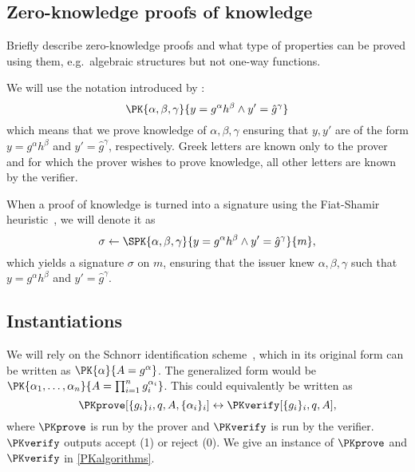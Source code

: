 \subsection{Zero-knowledge proofs of knowledge}%
\label{ZKPK}

Briefly describe zero-knowledge proofs and what type of properties can be proved 
using them, e.g.\ algebraic structures but not one-way functions.

We will use the notation introduced by \citet{PKnotation}:
\begin{equation}\label{PKexample}
  \PK{\alpha, \beta, \gamma}
  {y = g^\alpha h^\beta \land y' = \hat g^\gamma}
\end{equation}
which means that we prove knowledge of \(\alpha, \beta, \gamma\) ensuring that 
\(y, y'\) are of the form \(y = g^\alpha h^\beta\) and \(y' = \hat g^\gamma\), 
respectively.
Greek letters are known only to the prover and for which the prover wishes to 
prove knowledge, all other letters are known by the verifier.

When a proof of knowledge is turned into a signature using the Fiat-Shamir 
heuristic~\cite{FiatShamirHeuristic}, we will denote it as
\begin{equation*}\label{SPKexample}
  \sigma\gets \SPK{\alpha, \beta, \gamma}
  {y = g^\alpha h^\beta \land y' = \hat g^\gamma}
  {m},
\end{equation*}
which yields a signature \(\sigma\) on \(m\), ensuring that the issuer knew 
\(\alpha, \beta, \gamma\) such that \(y = g^\alpha h^\beta\) and \(y' = 
  \hat{g}^\gamma\).


\subsection{Instantiations}


We will rely on the Schnorr identification scheme~\cite{Schnorr}, which in its 
original form can be written as \(\PK{\alpha}{A = g^\alpha}\).
The generalized form would be \(\PK{\alpha_1, \dotsc, \alpha_n}{A = 
    \prod_{i=1}^n g_i^{\alpha_i}}\).
This could equivalently be written as
\begin{equation*}
  \PKprove[\{g_i\}_i, q, A, \{\alpha_i\}_i] \leftrightarrow
  \PKverify[\{g_i\}_i, q, A],
\end{equation*}
where \(\PKprove\) is run by the prover and \(\PKverify\) is run by the 
verifier.
\(\PKverify\) outputs accept (1) or reject (0).
We give an instance of \(\PKprove\) and \(\PKverify\) in \cref{PKalgorithms}.

